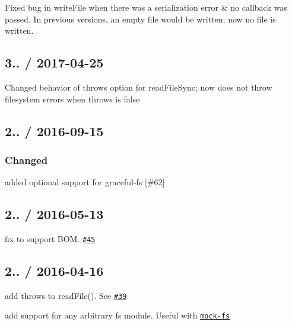 
\begin{DoxyItemize}
\item Fixed bug in {\ttfamily write\+File} when there was a serialization error \& no callback was passed. In previous versions, an empty file would be written; now no file is written.
\end{DoxyItemize}

\subsection*{3.. / 2017-\/04-\/25 }


\begin{DoxyItemize}
\item Changed behavior of {\ttfamily throws} option for {\ttfamily read\+File\+Sync}; now does not throw filesystem errors when {\ttfamily throws} is {\ttfamily false}
\end{DoxyItemize}

\subsection*{2.. / 2016-\/09-\/15 }

\subsubsection*{Changed}


\begin{DoxyItemize}
\item added optional support for {\ttfamily graceful-\/fs} \mbox{[}\#62\mbox{]}
\end{DoxyItemize}

\subsection*{2.. / 2016-\/05-\/13 }


\begin{DoxyItemize}
\item fix to support B\+OM. \href{https://github.com/jprichardson/node-jsonfile/issues/45}{\tt \#45}
\end{DoxyItemize}

\subsection*{2.. / 2016-\/04-\/16 }


\begin{DoxyItemize}
\item add {\ttfamily throws} to {\ttfamily read\+File()}. See \href{https://github.com/jprichardson/node-jsonfile/pull/39}{\tt \#39}
\item add support for any arbitrary {\ttfamily fs} module. Useful with \href{https://www.npmjs.com/package/mock-fs}{\tt mock-\/fs}
\end{DoxyItemize}

